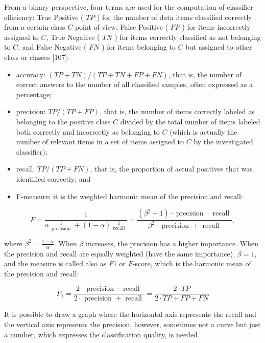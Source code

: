 \documentclass[10pt]{book}
\begin{document}
From a binary perspective, four terms are used for the computation of classifier efficiency: True Positive ( $T P$ ) for the number of data items classified correctly from a certain class $C$ point of view, False Positive ( $F P$ ) for items incorrectly assigned to $C$, True Negative ( $T N$ ) for items correctly classified as not belonging to $C$, and False Negative ( $F N$ ) for items belonging to $C$ but assigned to other class or classes [107]:

\begin{itemize}
  \item accuracy: $(T P+T N) /(T P+T N+F P+F N)$, that is, the number of correct answers to the number of all classified samples, often expressed as a percentage;
  \item precision: $T P /(T P+F P)$, that is, the number of items correctly labeled as belonging to the positive class $C$ divided by the total number of items labeled both correctly and incorrectly as belonging to $C$ (which is actually the number of relevant items in a set of items assigned to $C$ by the investigated classifier);
  \item recall: $T P /(T P+F N)$, that is, the proportion of actual positives that was identified correctly; and
  \item F-measure: it is the weighted harmonic mean of the precision and recall:
\end{itemize}

$$
F=\frac{1}{\alpha \frac{1}{\text { precision }}+(1-\alpha) \frac{1}{\text { recall }}}=\frac{\left(\beta^{2}+1\right) \cdot \text { precision } \cdot \text { recall }}{\beta^{2} \cdot \text { precision }+ \text { recall }},
$$

where $\beta^{2}=\frac{1-\alpha}{\alpha}$. When $\beta$ increases, the precision has a higher importance. When the precision and recall are equally weighted (have the same importance), $\beta=1$, and the measure is called also as $F 1$ or $F$-score, which is the harmonic mean of the precision and recall:

$$
F_{1}=\frac{2 \cdot \text { precision } \cdot \text { recall }}{2 \cdot \text { precision }+ \text { recall }}=\frac{2 \cdot T P}{2 \cdot T P+F P+F N}
$$

It is possible to draw a graph where the horizontal axis represents the recall and the vertical axis represents the precision, however, sometimes not a curve but just a number, which expresses the classification quality, is needed.
\end{document}
